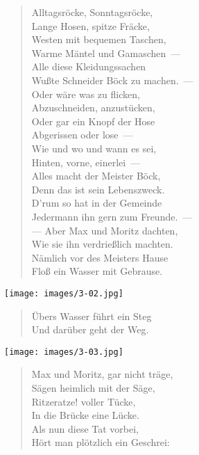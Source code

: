 \documentclass[a4paper,12pt]{article}
\begin{document}
\begin{verse}
Alltagsröcke, Sonntagsröcke,\\{}
Lange Hosen, spitze Fräcke,\\{}
Westen mit bequemen Taschen,\\{}
Warme Mäntel und Gamaschen~—\\{}
Alle diese Kleidungssachen\\{}
Wußte Schneider Böck zu machen.~—\\{}
Oder wäre was zu flicken,\\{}
Abzuschneiden, anzustücken,\\{}
Oder gar ein Knopf der Hose\\{}
Abgerissen oder lose~—\\{}
Wie und wo und wann es sei,\\{}
Hinten, vorne, einerlei~—\\{}
Alles macht der Meister Böck,\\{}
Denn das ist sein Lebenszweck.\\{}
D'rum so hat in der Gemeinde\\{}
Jedermann ihn gern zum Freunde.~—\\{}
— Aber Max und Moritz dachten,\\{}
Wie sie ihn verdrießlich machten.\\{}
Nämlich vor des Meisters Hause\\{}
Floß ein Wasser mit Gebrause.
\end{verse}



\begin{center}\texttt{[image: images/3-02.jpg]}\end{center}



\begin{verse}
Übers Wasser führt ein Steg\\{}
Und darüber geht der Weg.
\end{verse}



\begin{center}\texttt{[image: images/3-03.jpg]}\end{center}



\begin{verse}
Max und Moritz, gar nicht träge,\\{}
Sägen heimlich mit der Säge,\\{}
Ritzeratze! voller Tücke,\\{}
In die Brücke eine Lücke.\\{}
Als nun diese Tat vorbei,\\{}
Hört man plötzlich ein Geschrei:
\end{verse}
\end{document}
